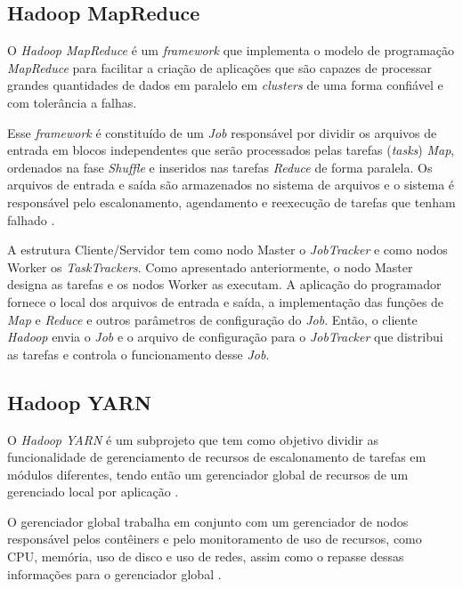 \subsection{Hadoop MapReduce} \label{ssec:hadoopmapreduce}

O \textit{Hadoop MapReduce} é um \textit{\gls{framework}} que implementa o modelo de programação \textit{MapReduce} para facilitar a criação de aplicações que são capazes de processar grandes quantidades de dados em paralelo em \textit{clusters} de uma forma confiável e com tolerância a falhas. 

Esse \textit{\gls{framework}} é constituído de um \textit{Job} responsável por dividir os arquivos de entrada em blocos independentes que serão processados pelas tarefas (\textit{tasks}) \textit{Map}, ordenados na fase \textit{Shuffle} e inseridos nas tarefas \textit{Reduce} de forma paralela. Os arquivos de entrada e saída são armazenados no sistema de arquivos e o sistema é responsável pelo escalonamento, agendamento e reexecução de tarefas que tenham falhado \cite{HadoopMapReduce22}.

A estrutura Cliente/Servidor tem como nodo Master o \textit{JobTracker} e como nodos Worker os \textit{TaskTrackers}. Como apresentado anteriormente, o nodo Master designa as tarefas e os nodos Worker as executam. A aplicação do programador fornece o local dos arquivos de entrada e saída, a implementação das funções de \textit{Map} e \textit{Reduce} e outros parâmetros de configuração do \textit{Job}. Então, o cliente \textit{Hadoop} envia o \textit{Job} e o arquivo de configuração para o \textit{JobTracker} que distribui as tarefas e controla o funcionamento desse \textit{Job}.

\subsection{Hadoop YARN} \label{ssec:hadoopyarn}

O \textit{Hadoop YARN} é um subprojeto que tem como objetivo dividir as funcionalidade de gerenciamento de recursos de escalonamento de tarefas em módulos diferentes, tendo então um gerenciador global de recursos de um gerenciado local por aplicação \cite{GoldmanApache12}. 

O gerenciador global trabalha em conjunto com um gerenciador de nodos responsável pelos contêiners e pelo monitoramento de uso de recursos, como CPU, memória, uso de disco e uso de redes, assim como o repasse dessas informações para o gerenciador global \cite{HadoopYarn22}.

